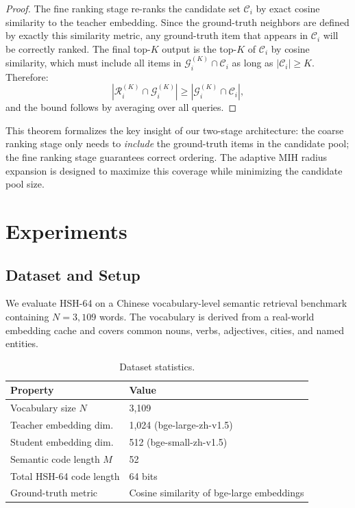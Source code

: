 \documentclass[11pt,a4paper]{article}
\begin{document}
\begin{proof}
The fine ranking stage re-ranks the candidate set $\mathcal{C}_i$ by exact cosine similarity to the teacher embedding. Since the ground-truth neighbors are defined by exactly this similarity metric, any ground-truth item that appears in $\mathcal{C}_i$ will be correctly ranked. The final top-$K$ output is the top-$K$ of $\mathcal{C}_i$ by cosine similarity, which must include all items in $\mathcal{G}_i^{(K)} \cap \mathcal{C}_i$ as long as $|\mathcal{C}_i| \geq K$. Therefore:
\begin{equation}
    |\mathcal{R}_i^{(K)} \cap \mathcal{G}_i^{(K)}| \geq |\mathcal{G}_i^{(K)} \cap \mathcal{C}_i|,
\end{equation}
and the bound follows by averaging over all queries.
\end{proof}

This theorem formalizes the key insight of our two-stage architecture: the coarse ranking stage only needs to \emph{include} the ground-truth items in the candidate pool; the fine ranking stage guarantees correct ordering. The adaptive MIH radius expansion is designed to maximize this coverage while minimizing the candidate pool size.

\section{Experiments}

\subsection{Dataset and Setup}

We evaluate HSH-64 on a Chinese vocabulary-level semantic retrieval benchmark containing $N=3{,}109$ words. The vocabulary is derived from a real-world embedding cache and covers common nouns, verbs, adjectives, cities, and named entities.

\begin{table}[htbp]
\centering
\caption{Dataset statistics.}
\label{tab:dataset}
\begin{tabular}{ll}
\toprule
\textbf{Property} & \textbf{Value} \\
\midrule
Vocabulary size $N$ & 3,109 \\
Teacher embedding dim. & 1,024 (bge-large-zh-v1.5) \\
Student embedding dim. & 512 (bge-small-zh-v1.5) \\
Semantic code length $M$ & 52 \\
Total HSH-64 code length & 64 bits \\
Ground-truth metric & Cosine similarity of bge-large embeddings \\
\bottomrule
\end{tabular}
\end{table}
\end{document}
